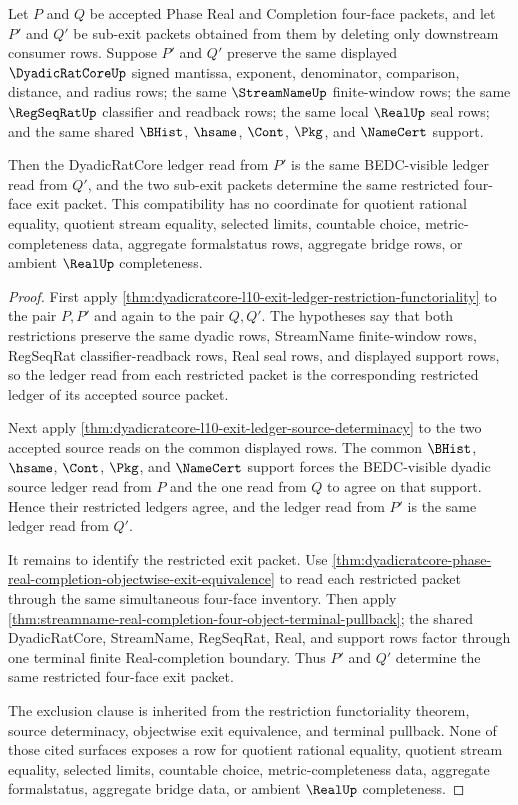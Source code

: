 \begin{theorem}
\label{thm:dyadicratcore-l10-exit-ledger-common-restriction-compatibility}
Let $P$ and $Q$ be accepted Phase Real and Completion four-face packets, and let $P'$ and $Q'$ be sub-exit packets obtained from them by deleting only downstream consumer rows. Suppose $P'$ and $Q'$ preserve the same displayed $\DyadicRatCoreUp$ signed mantissa, exponent, denominator, comparison, distance, and radius rows; the same $\StreamNameUp$ finite-window rows; the same $\RegSeqRatUp$ classifier and readback rows; the same local $\RealUp$ seal rows; and the same shared $\BHist$, $\hsame$, $\Cont$, $\Pkg$, and $\NameCert$ support.

Then the DyadicRatCore ledger read from $P'$ is the same BEDC-visible ledger read from $Q'$, and the two sub-exit packets determine the same restricted four-face exit packet. This compatibility has no coordinate for quotient rational equality, quotient stream equality, selected limits, countable choice, metric-completeness data, aggregate formalstatus rows, aggregate bridge rows, or ambient $\RealUp$ completeness.
\end{theorem}
\begin{proof}
First apply \autoref{thm:dyadicratcore-l10-exit-ledger-restriction-functoriality} to the pair $P,P'$ and again to the pair $Q,Q'$. The hypotheses say that both restrictions preserve the same dyadic rows, StreamName finite-window rows, RegSeqRat classifier-readback rows, Real seal rows, and displayed support rows, so the ledger read from each restricted packet is the corresponding restricted ledger of its accepted source packet.

Next apply \autoref{thm:dyadicratcore-l10-exit-ledger-source-determinacy} to the two accepted source reads on the common displayed rows. The common $\BHist$, $\hsame$, $\Cont$, $\Pkg$, and $\NameCert$ support forces the BEDC-visible dyadic source ledger read from $P$ and the one read from $Q$ to agree on that support. Hence their restricted ledgers agree, and the ledger read from $P'$ is the same ledger read from $Q'$.

It remains to identify the restricted exit packet. Use \autoref{thm:dyadicratcore-phase-real-completion-objectwise-exit-equivalence} to read each restricted packet through the same simultaneous four-face inventory. Then apply \autoref{thm:streamname-real-completion-four-object-terminal-pullback}; the shared DyadicRatCore, StreamName, RegSeqRat, Real, and support rows factor through one terminal finite Real-completion boundary. Thus $P'$ and $Q'$ determine the same restricted four-face exit packet.

The exclusion clause is inherited from the restriction functoriality theorem, source determinacy, objectwise exit equivalence, and terminal pullback. None of those cited surfaces exposes a row for quotient rational equality, quotient stream equality, selected limits, countable choice, metric-completeness data, aggregate formalstatus, aggregate bridge data, or ambient $\RealUp$ completeness.
\end{proof}


